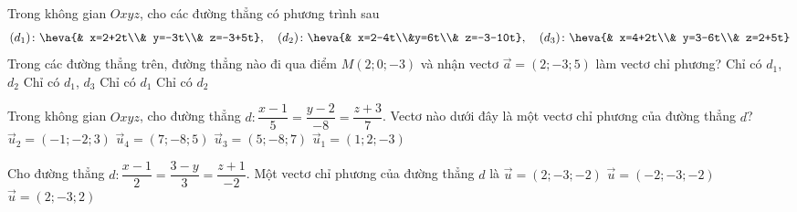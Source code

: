	\begin{ex}%
	Trong không gian $Oxyz$, cho các đường thẳng có phương trình sau 
	\begin{align*}
	(d_1)\colon\heva{& x=2+2t\\& y=-3t\\& z=-3+5t},
	\quad (d_2)\colon\heva{& x=2-4t\\&y=6t\\& z=-3-10t},
	\quad (d_3)\colon\heva{& x=4+2t\\& y=3-6t\\& z=2+5t}
	\end{align*}
	Trong các đường thẳng trên, đường thẳng nào đi qua điểm $M(2;0;-3)$ và nhận vectơ $\overrightarrow{a}=(2;-3;5)$ làm vectơ chỉ phương?
	\choice
	{\True Chỉ có $d_1$, $d_2$}
	{Chỉ có $d_1$, $d_3$}
	{Chỉ có $d_1$}
	{Chỉ có $d_2$}
	\end{ex}
	\begin{ex}%
	Trong không gian $Oxyz$, cho đường thẳng $d\colon\dfrac{x-1}{5}=\dfrac{y-2}{-8}=\dfrac{z+3}{7}$. Vectơ nào dưới đây là một vectơ chỉ phương của đường thẳng $d$?
	\choice
	{$\overrightarrow{u}_2=(-1;-2;3)$}
	{$\overrightarrow{u}_4=(7;-8;5)$}
	{\True $\overrightarrow{u}_3=(5;-8;7)$}
	{$\overrightarrow{u}_1=(1;2;-3)$}
	\end{ex}
	\begin{ex}%
	Cho đường thẳng $d\colon \dfrac{x-1}{2}=\dfrac{3-y}{3}=\dfrac{z+1}{-2}$. Một vectơ chỉ phương của đường thẳng $d$ là
	{\True $\overrightarrow{u}=(2;-3;-2)$}
	{$\overrightarrow{u}=(-2;-3;-2)$}
	{$\overrightarrow{u}=(2;-3;2)$}
	\end{ex}
